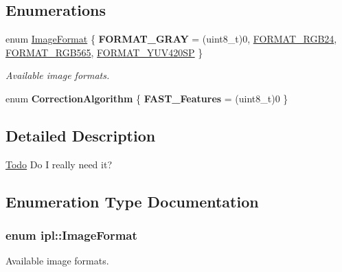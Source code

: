 \subsection*{Enumerations}
\begin{DoxyCompactItemize}
\item 
enum \hyperlink{namespaceipl_ab3ec5a63ba3d76c0f5e35b7c8595ef32}{ImageFormat} \{ {\bfseries FORMAT\_\-GRAY} =  (uint8\_\-t)0, 
\hyperlink{namespaceipl_ab3ec5a63ba3d76c0f5e35b7c8595ef32ac807b5b69d6a62e4d1e62175439e92ca}{FORMAT\_\-RGB24}, 
\hyperlink{namespaceipl_ab3ec5a63ba3d76c0f5e35b7c8595ef32a0e0667ab94da0c9d2febbb5a9201e2c5}{FORMAT\_\-RGB565}, 
\hyperlink{namespaceipl_ab3ec5a63ba3d76c0f5e35b7c8595ef32adae11119e2524e2d0010a008dc7e734a}{FORMAT\_\-YUV420SP}
 \}
\begin{DoxyCompactList}\small\item\em Available image formats. \end{DoxyCompactList}\item 
enum {\bfseries CorrectionAlgorithm} \{ {\bfseries FAST\_\-Features} =  (uint8\_\-t)0
 \}
\end{DoxyCompactItemize}


\subsection{Detailed Description}
\begin{Desc}
\item[\hyperlink{todo__todo000003}{Todo}]Do I really need it? \end{Desc}


\subsection{Enumeration Type Documentation}
\hypertarget{namespaceipl_ab3ec5a63ba3d76c0f5e35b7c8595ef32}{
\subsubsection[{ImageFormat}]{\setlength{\rightskip}{0pt plus 5cm}enum {\bf ipl::ImageFormat}}}
\label{namespaceipl_ab3ec5a63ba3d76c0f5e35b7c8595ef32}


Available image formats. 

